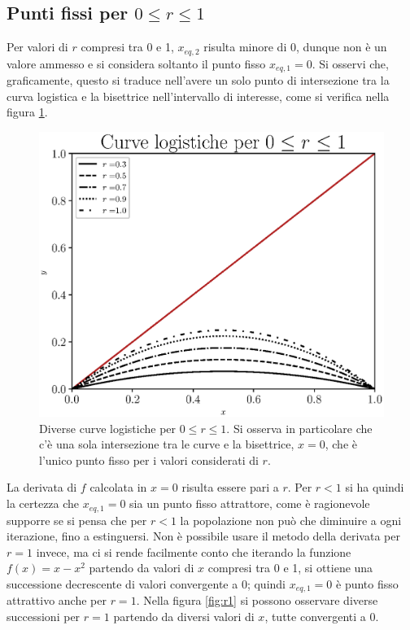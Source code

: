 \subsection{Punti fissi per $0\leq r \leq 1$}
Per valori di $r$ compresi tra 0 e 1, $x_{eq,2}$ risulta minore di 0, dunque non è un valore ammesso e si considera soltanto il punto fisso $x_{eq,1} = 0$. Si osservi che, graficamente, questo si traduce nell'avere un solo punto di intersezione tra la curva logistica e la bisettrice nell'intervallo di interesse, come si verifica nella figura \ref{fig:logistiche_r_minore_1}. 
\begin{figure}[h!]
    \begin{center}
        \includegraphics[scale=0.7]{Immagini/curve_logistiche_r_minore_1.eps} 
    \captionsetup{width=.8\linewidth}
    \caption{Diverse curve logistiche per $0\leq r \leq 1$. Si osserva in particolare che c'è una sola intersezione tra le curve e la bisettrice, $x = 0$, che è l'unico punto fisso per i valori considerati di $r$.}
    \label{fig:logistiche_r_minore_1}
    \end{center}
\end{figure}

La derivata di $f$ calcolata in $x = 0$ risulta essere pari a $r$. Per $r < 1$ si ha quindi la certezza che $x_{eq,1} = 0$ sia un punto fisso attrattore, come è ragionevole supporre se si pensa che per $r<1$ la popolazione non può che diminuire a ogni iterazione, fino a estinguersi. Non è possibile usare il metodo della derivata per $r = 1$ invece, ma ci si rende facilmente conto che iterando la funzione $f(x) = x - x^2$ partendo da valori di $x$ compresi tra 0 e 1, si ottiene una successione decrescente di valori convergente a 0; quindi $x_{eq,1} = 0$ è punto fisso attrattivo anche per $r = 1$. Nella figura \ref{fig:r1} si possono osservare diverse successioni per $r=1$ partendo da diversi valori di $x$, tutte convergenti a 0.

